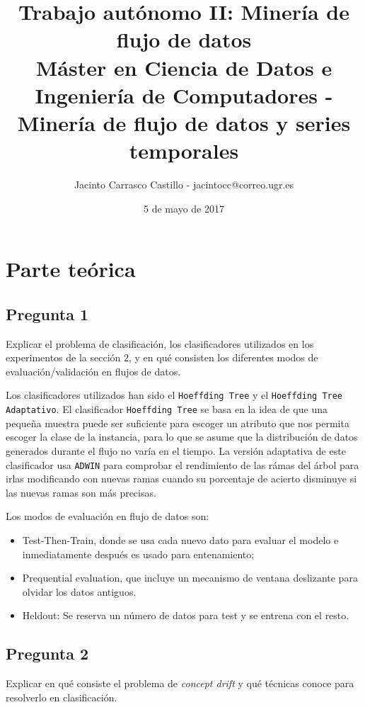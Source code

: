\documentclass[11pt]{article}
\author{Jacinto Carrasco Castillo - jacintocc@correo.ugr.es}
\date{5 de mayo de 2017}
\title{Trabajo autónomo II: Minería de flujo de datos\\\medskip
\large Máster en Ciencia de Datos e Ingeniería de Computadores - Minería de flujo de datos y series temporales}
\begin{document}
\maketitle
\setcounter{tocdepth}{2}
\tableofcontents


\section{Parte teórica}
\label{sec:orgfdc5129}

\subsection{Pregunta 1}
\label{sec:org86efbe3}

Explicar el problema de clasificación, los clasificadores utilizados
 en los experimentos de la sección 2, y en qué consisten los
 diferentes modos de evaluación/validación en  flujos de datos.

Los clasificadores utilizados han sido el \texttt{Hoeffding Tree} y el
\texttt{Hoeffding Tree Adaptativo}. El clasificador \texttt{Hoeffding Tree} se basa
en la idea de que una pequeña muestra puede ser suficiente para
escoger un atributo que nos permita escoger la clase de la instancia,
para lo que se asume que la distribución de datos generados durante el
flujo no varía en el tiempo. La versión adaptativa de este
clasificador usa \texttt{ADWIN} para comprobar el rendimiento de las rámas
del árbol para irlas modificando con nuevas ramas cuando su porcentaje
de acierto disminuye si las nuevas ramas son más precisas.

Los modos de evaluación en flujo de datos son:
\begin{itemize}
\item Test-Then-Train, donde se usa cada nuevo dato para evaluar
el modelo e inmediatamente después es usado para
entenamiento;
\item Prequential evaluation, que incluye un mecanismo de ventana
deslizante para olvidar los datos antiguos.
\item Heldout: Se reserva un número de datos para test y se
entrena con el resto.
\end{itemize}

\subsection{Pregunta 2}
\label{sec:org34b12da}

Explicar en qué consiste el problema de \emph{concept drift} y qué
 técnicas conoce para resolverlo en clasificación.
\end{document}
